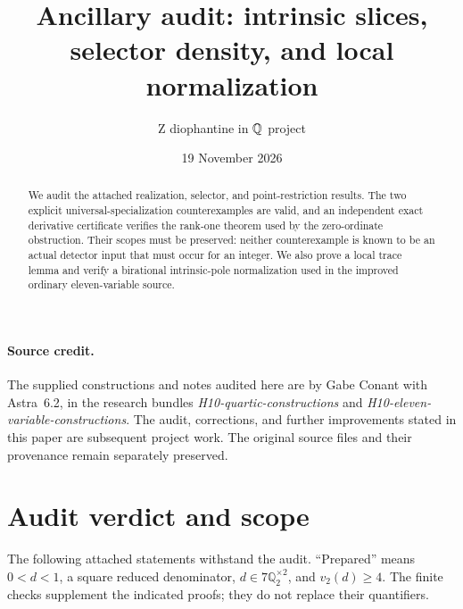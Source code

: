 \documentclass[11pt,a4paper]{article}
\title{Ancillary audit: intrinsic slices, selector density, and local normalization}
\author{Z diophantine in $\Q$ project}
\date{19 November 2026}
\newcommand{\Q}{\mathbb Q}\newcommand{\Z}{\mathbb Z}
\begin{document}
\maketitle
\begin{abstract}
We audit the attached realization, selector, and point-restriction results.
The two explicit universal-specialization counterexamples are valid, and
an independent exact derivative certificate verifies the rank-one theorem
used by the zero-ordinate obstruction. Their scopes must be preserved:
neither counterexample is known to be an actual detector input that must
occur for an integer. We also prove a local trace lemma and verify a
birational intrinsic-pole normalization used in the improved ordinary
eleven-variable source.
\end{abstract}

\paragraph{Source credit.}
The supplied constructions and notes audited here are by Gabe Conant with
Astra~6.2, in the research bundles
\emph{H10-quartic-constructions} and
\emph{H10-eleven-variable-constructions}.
The audit, corrections, and further improvements stated in this paper are
subsequent project work. The original source files and their provenance
remain separately preserved.

\section{Audit verdict and scope}
The following attached statements withstand the audit. ``Prepared'' means
$0<d<1$, a square reduced denominator, $d\in7\Q_2^{\times2}$, and
$v_2(d)\ge4$. The finite checks supplement the indicated proofs; they do
not replace their quantifiers.
\end{document}
